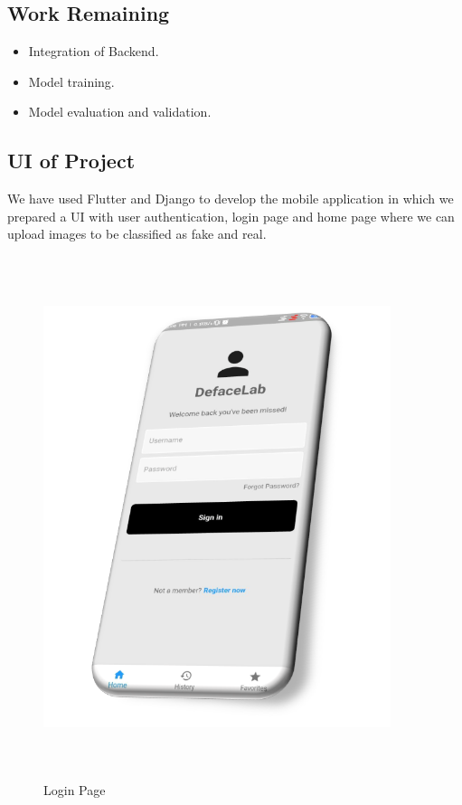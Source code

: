 \subsection{Work Remaining}
\begin{itemize}
    \item Integration of Backend.
    \item Model training.
    \item Model evaluation and validation.
\end{itemize}

\subsection{UI of Project}
We have used Flutter and Django to develop the mobile application in which we prepared a
UI with user authentication, login page and home page where we can upload images to be classified as fake and real.

\begin{figure}[ht]
    \centering
    \includegraphics[width= 4in, height =6in ]{img/loginpagev2.png}
    \caption{Login Page }
\end{figure}

